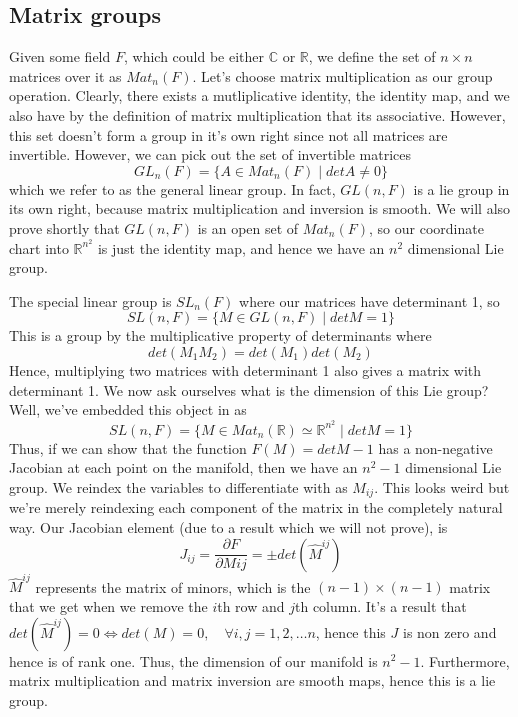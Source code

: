 \subsection{Matrix groups}
Given some field $F$, which could be either $\mathbb{C}$ or $\mathbb{R}$, we define the set of $n \times n$ matrices over it as $Mat_n (F)$. Let's choose matrix multiplication as our group operation. Clearly, there exists a mutliplicative identity, the identity map, and we also have by the definition of matrix multiplication that its associative. However, this set doesn't form a group in it's own right since not all matrices are invertible. However, we can pick out the set of invertible matrices 
\[
	GL_n(F) = \{A \in Mat_n(F) \mid det A \neq 0 \}  
\]
which we refer to as the general linear group. In fact, $GL(n, F)$ is a lie group in its own right, because matrix multiplication and inversion is smooth. We will also prove shortly that $GL(n, F)$ is an open set of $Mat_n(F)$, so our coordinate chart into $\mathbb{R}^{n^2}$ is just the identity map, and hence we have an $n^2$ dimensional Lie group.  

The special linear group is $SL_n(F)$ where our matrices have determinant 1, so 
\[ 
	SL(n, F) = \{ M \in GL(n, F) \mid det M = 1 \} 
\] 
This is a group by the multiplicative property of determinants where 
\[ 
	det(M_1 M_2) = det(M_1)det(M_2)
\] Hence, multiplying two matrices with determinant 1 also gives a matrix with determinant 1. We now ask ourselves what is the dimension of this Lie group? Well, we've embedded this object in as 
\[
	SL(n, F) = \{ M \in Mat_n(\mathbb{ R}) \simeq \mathbb{R}^{ n^2 } \mid det M = 1 \}
\]
Thus, if we can show that the function $F(M) = det M - 1 $ has a non-negative Jacobian at each point on the manifold, then we have an $n^2 - 1$ dimensional Lie group.  
We reindex the variables to differentiate with as $M_{ij}$. This looks weird but we're merely reindexing each component of the matrix in the completely natural way. Our Jacobian element (due to a result which we will not prove), is 
\[ 
	J_{ij}  = \frac{\partial F}{\partial M{ij} } = \pm det ( \hat{M}^{ ij } ) 
\] 
$\hat{M}^{ ij} $ represents the matrix of minors, which is the $(n - 1) \times ( n - 1) $ matrix that we get when we remove the $i$th row and $j$th column. It's a result that $det(\hat{M}^{ ij } )  = 0 \iff det(M) = 0, \quad \forall i, j = 1, 2,\dots n$, hence this $J$ is non zero and hence is of rank one. Thus, the dimension of our manifold is $n^2 -1 $. Furthermore, matrix multiplication and matrix inversion are smooth maps, hence this is a lie group. 

